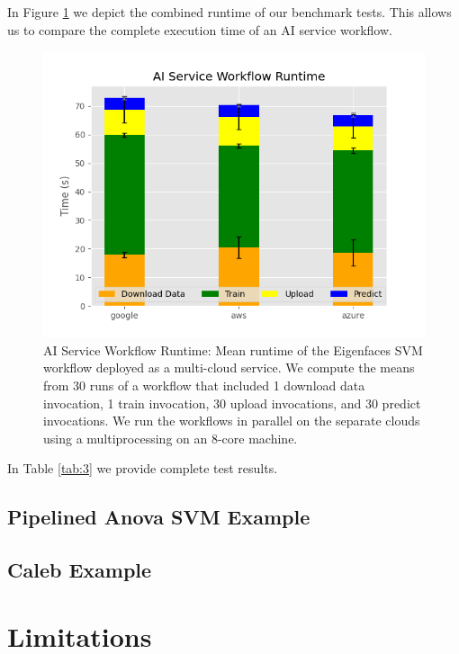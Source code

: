 In Figure \ref{fig:7} we depict the combined runtime of our benchmark tests. This
allows us to compare the complete execution time of an AI service
workflow.

\begin{figure}
\centering
\includegraphics[width=\columnwidth]{images/ai_service_workflow_runtime.png}
\caption{AI Service Workflow Runtime: Mean runtime of the Eigenfaces SVM workflow deployed
as a multi-cloud service. We compute the means from 30 runs of a
workflow that included 1 download data invocation, 1 train invocation,
30 upload invocations, and 30 predict invocations. We run the workflows
in parallel on the separate clouds using a multiprocessing on an 8-core
machine.}
\label{fig:7}
\end{figure}

In Table \ref{tab:3} we provide complete test results.



\subsection{Pipelined Anova SVM Example}
\label{pipelined-anova-svm-example}

\subsection{Caleb Example}\label{caleb-example}

\section{Limitations}\label{limitations}

